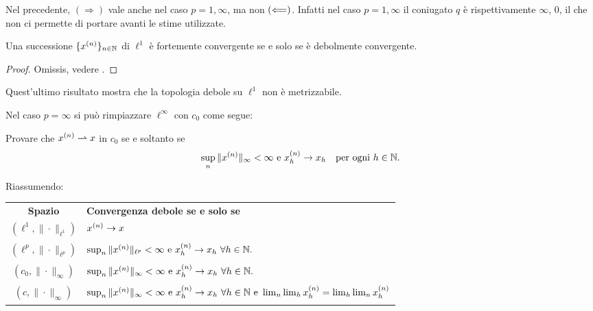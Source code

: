 \begin{remark}
	Nel precedente, $(\Longrightarrow)$ vale anche nel caso $p=1,\infty$, ma non $(\Longleftarrow)$. Infatti nel caso $p=1,\infty$ il coniugato $q$ è rispettivamente $\infty$, $0$, il che non ci permette di portare avanti le stime utilizzate.
\end{remark}

\begin{theorem}
	Una successione $\{x^{(n)}\}_{n \in \mathbb{N}}$ di $\ell^1$ è fortemente convergente se e solo se è debolmente convergente.
\end{theorem}
\begin{proof}
	Omissis, vedere \cite{brezis2010functional}.
\end{proof}

\begin{remark}
	Quest'ultimo risultato mostra che la topologia debole su $\ell^1$ non è metrizzabile.
\end{remark}

\begin{remark}
	Nel caso $p=\infty$ si può rimpiazzare $\ell^\infty$ con $c_0$ come segue:
\end{remark}

\begin{exercise}
	Provare che $x^{(n)} \rightharpoonup x$ in $c_0$ se e soltanto se
	\begin{equation*}
		\sup_n \|x^{(n)}\|_{\infty} < \infty \ \text{e}\ x^{(n)}_h \underset{{}}{\rightarrow} x_h \quad \text{per ogni $h \in \mathbb{N}$}.
	\end{equation*}
\end{exercise}

Riassumendo:

\begin{center}
	\begin{tabular}{cl}
		\textbf{Spazio} & \textbf{Convergenza debole se e solo se}\\
		$(\ell^1, \|\cdot\|_{\ell^1})$ & $x^{(n)} \underset{{}}{\rightarrow} x$\\
		$(\ell^p, \|\cdot\|_{\ell^p})$ & $\sup_n \|x^{(n)}\|_{\ell^p} < \infty \ \text{e}\ x^{(n)}_h \conv x_h \ \forall h \in \N.$\\
		$(c_0, \|\cdot\|_\infty)$ & $\sup_n \|x^{(n)}\|_{\infty} < \infty \ \text{e}\ x^{(n)}_h \conv x_h \ \forall h \in \N.$\\
		$(c, \|\cdot\|_\infty)$ & $\sup_n \|x^{(n)}\|_{\infty} < \infty \ \text{e}\ x^{(n)}_h \conv x_h \ \forall h \in \N \ \text{e}\ \lim_n\lim_h x^{(n)}_h = \lim_h \lim_n x_h^{(n)}$
	\end{tabular}
\end{center}
\vspace{1ex}

